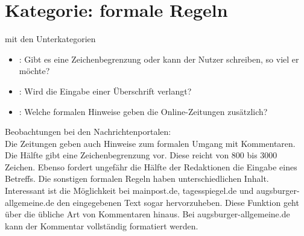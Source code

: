 \section{Kategorie: \glqq formale Regeln\grqq}

mit  den Unterkategorien
\begin{itemize}
\item{}\grqq: Gibt es eine Zeichenbegrenzung oder kann der Nutzer schreiben, so viel er möchte?


\item{}\grqq: Wird die Eingabe einer Überschrift verlangt?


\item{}\grqq: Welche formalen Hinweise geben die Online-Zeitungen zusätzlich?
\end{itemize}


Beobachtungen bei den Nachrichtenportalen:\\
Die Zeitungen geben auch Hinweise zum formalen Umgang mit Kommentaren. Die Hälfte gibt eine Zeichenbegrenzung vor. Diese reicht von 800 bis 3000 Zeichen. 
Ebenso fordert ungefähr die Hälfte der Redaktionen die Eingabe eines Betreffs. Die sonstigen formalen Regeln haben unterschiedlichen Inhalt. Interessant ist die Möglichkeit bei mainpost.de, tagesspiegel.de und augsburger-allgemeine.de den eingegebenen Text sogar hervorzuheben. Diese Funktion geht über die übliche Art von Kommentaren hinaus. Bei augsburger-allgemeine.de kann der Kommentar vollständig formatiert werden.


